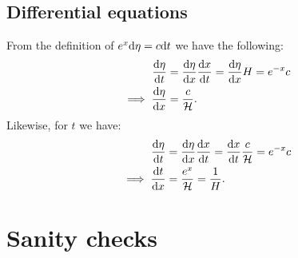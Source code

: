     \subsection{Differential equations}
    From the definition of $e^x\mathrm{d}\eta = c\mathrm{d} t$ we have the following:
    \begin{equation}
        \begin{split}
            \dv{\eta}{t} &= \dv{\eta}{x}\dv{x}{t}= \dv{\eta}{x}H = e^{-x}c \\
            \implies \dv{\eta}{x} &= \frac{c}{\mathcal{H}}.
        \end{split}
    \end{equation}
    Likewise, for $t$ we have:
    \begin{equation}
        \begin{split}
            \dv{\eta}{t} &= \dv{\eta}{x}\dv{x}{t} = \dv{x}{t}\frac{c}{\mathcal{H}} = e^{-x}c\\
            \implies \dv{t}{x} &= \frac{e^x}{\mathcal{H}} = \frac{1}{H}.
        \end{split}
    \end{equation}


\section{Sanity checks}\label{app:sanity}
